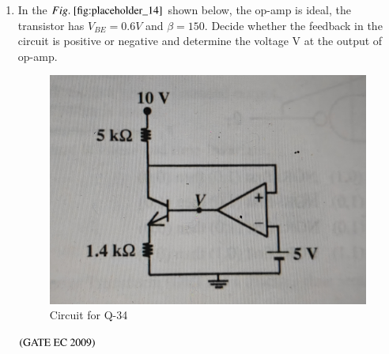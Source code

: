 \documentclass[journal,12pt,onecolumn]{IEEEtran}
\theoremstyle{remark}
\begin{document}
\begin{enumerate}[start=1, label={Q\arabic*.}]
\item In the $\figref{fig:placeholder_14}$ shown below, the op-amp is ideal, the transistor has $V_{BE} = 0.6 V$ and $\beta = 150$. Decide whether the feedback in the circuit is positive or negative and determine the voltage V at the output of op-amp.     
\begin{figure}[H]
    \centering
    \includegraphics[width=0.5\columnwidth]{figs/fig_14.jpg}
    \caption{\centering Circuit for Q-34}
    \label{fig:placeholder_14}
\end{figure}
\begin{enumerate}
\end{enumerate}
\hfill $\left(\text{GATE EC 2009}\right)$


\end{enumerate}
\end{document}
